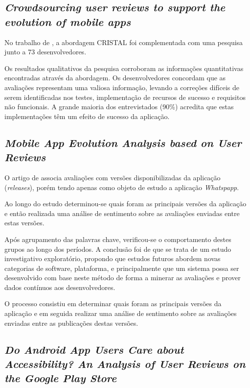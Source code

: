 \subsection{\textit{Crowdsourcing user reviews to support the evolution of mobile apps}}

No trabalho de , a abordagem CRISTAL foi complementada com uma pesquisa junto a 73 desenvolvedores.

Os resultados qualitativos da pesquisa corroboram as informações quantitativas encontradas através da abordagem. Os desenvolvedores concordam que as avaliações representam uma valiosa informação, levando a correções difíceis de serem identificadas nos testes, implementação de recursos de sucesso e requisitos não funcionais. A grande maioria dos entrevistados (90\%) acredita que estas implementações têm um efeito de sucesso da aplicação.

\subsection{\textit{Mobile App Evolution Analysis based on User Reviews}}

O artigo de  associa avaliações com versões disponibilizadas da aplicação (\textit{releases}), porém tendo apenas como objeto de estudo a aplicação \textit{Whatspapp}.

Ao longo do estudo determinou-se quais foram as principais versões da aplicação e então realizada uma análise de sentimento sobre as avaliações enviadas entre estas versões.

Após agrupamento das palavras chave, verificou-se o comportamento destes grupos ao longo dos períodos. A conclusão foi de que se trata de um estudo investigativo exploratório, propondo que estudos futuros abordem novas categorias de software, plataforma, e principalmente que um sistema possa ser desenvolvido com base neste método de forma a minerar as avaliações e prover dados contínuos aos desenvolvedores.

O processo consistiu em determinar quais foram as principais versões da aplicação e em seguida realizar uma análise de sentimento sobre as avaliações enviadas entre as publicações destas versões.

\subsection{\textit{Do Android App Users Care about Accessibility? An Analysis of User Reviews on the Google Play Store}}

